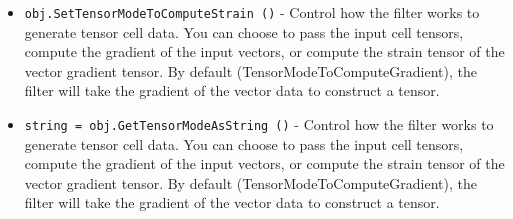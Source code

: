 \begin{itemize}
\item  \verb|obj.SetTensorModeToComputeStrain ()| -  Control how the filter works to generate tensor cell data. You can
 choose to pass the input cell tensors, compute the gradient of
 the input vectors, or compute the strain tensor of the vector gradient
 tensor. By default (TensorModeToComputeGradient), the filter will
 take the gradient of the vector data to construct a tensor.

\item  \verb|string = obj.GetTensorModeAsString ()| -  Control how the filter works to generate tensor cell data. You can
 choose to pass the input cell tensors, compute the gradient of
 the input vectors, or compute the strain tensor of the vector gradient
 tensor. By default (TensorModeToComputeGradient), the filter will
 take the gradient of the vector data to construct a tensor.

\end{itemize}
